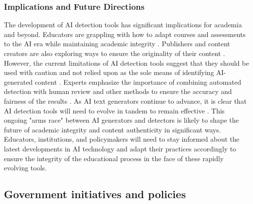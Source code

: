 \documentclass{article}
\begin{document}
\subsubsection{Implications and Future Directions}
The development of AI detection tools has significant implications for academia
and beyond. Educators are grappling with how to adapt courses and assessments
to the AI era while maintaining academic integrity
\cite{https://www.scribbr.com/ai-tools/how-do-ai-detectors-work/}
\cite{https://kb.iu.edu/d/bimt}. Publishers and content creators are
also exploring ways to ensure the originality of their content
\cite{https://www.scribbr.com/ai-tools/how-do-ai-detectors-work/}.
However, the current limitations of AI detection tools suggest that they
should be used with caution and not relied upon as the sole means of
identifying AI-generated content \cite{https://edintegrity.biomedcentral.com/articles/10.1007/s40979-023-00146-z}
\cite{https://edintegrity.biomedcentral.com/articles/10.1007/s40979-023-00140-5}
\cite{https://kb.iu.edu/d/bimt}. Experts emphasize the importance of
combining automated detection with human review and other methods to ensure
the accuracy and fairness of the results \cite{https://edintegrity.biomedcentral.com/articles/10.1007/s40979-023-00146-z}
\cite{https://edintegrity.biomedcentral.com/articles/10.1007/s40979-023-00140-5}.
As AI text generators continue to advance, it is clear that AI detection tools will
need to evolve in tandem to remain effective \cite{https://surferseo.com/blog/how-do-ai-content-detectors-work/}
\cite{https://contadu.com/ai-detection-tools-the-challenge-of-todays-digital-age/}
\cite{https://edintegrity.biomedcentral.com/articles/10.1007/s40979-023-00140-5}.
This ongoing "arms race" between AI generators and detectors is likely to shape
the future of academic integrity and content authenticity in significant ways.
Educators, institutions, and policymakers will need to stay informed about the
latest developments in AI technology and adapt their practices accordingly to
ensure the integrity of the educational process in the face of these rapidly evolving tools.


\subsection{Government initiatives and policies}
\end{document}
